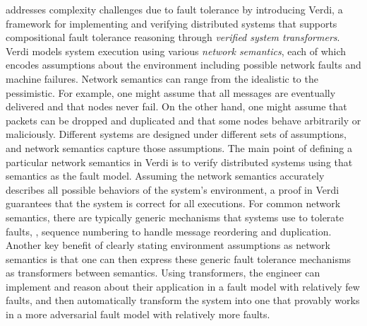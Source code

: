  addresses complexity challenges due to fault tolerance
  by introducing Verdi,
  a \Coq~\cite{Coq} framework for implementing and verifying distributed systems
  that supports compositional fault tolerance reasoning
  through \emph{verified system transformers}.
Verdi models system execution using various \emph{network semantics},
  each of which encodes assumptions about the environment
  including possible network faults and machine failures.
Network semantics can range from the idealistic to the pessimistic.
For example, one might assume that
  all messages are eventually delivered and that nodes never fail.
On the other hand, one might assume that
  packets can be dropped and duplicated and that
  some nodes behave arbitrarily or maliciously.
Different systems are designed under different sets of assumptions,
  and network semantics capture those assumptions.
The main point of defining a particular network semantics in Verdi is
  to verify distributed systems using that semantics as the fault model.
Assuming the network semantics accurately describes
  all possible behaviors of the system's environment,
  a proof in Verdi guarantees that the system is correct for all executions.
For common network semantics,
  there are typically generic mechanisms that systems use to tolerate faults,
  \eg, sequence numbering to handle message reordering and duplication.
Another key benefit of
  clearly stating environment assumptions as network semantics is that
  one can then express these generic fault tolerance mechanisms
  as transformers between semantics.
Using transformers, the engineer can
  implement and reason about their application
  in a fault model with relatively few faults, and
  then automatically transform the system into one
  that provably works in a more adversarial fault model
  with relatively more faults.




